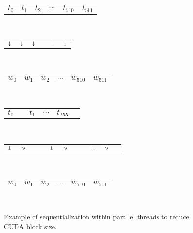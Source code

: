 \begin{figure}
  \centering
  \begin{minipage}{0.45\textwidth}
    \centering
      \begin{tabular}{C{0.6cm}C{0.6cm}C{0.6cm}C{0.6cm}C{0.6cm}C{0.6cm}}
        $t_0$ & $t_1$ & $t_2$ & $\cdots$ & $t_{510}$ & $t_{511}$\\
      \end{tabular}\\[-0.5ex]
      \begin{tabular}{C{0.6cm}C{0.6cm}C{0.6cm}C{0.6cm}C{0.6cm}C{0.6cm}}
        $\shortdownarrow$ & $\shortdownarrow$ & $\shortdownarrow$ & & $\shortdownarrow$ & $\shortdownarrow$\\
      \end{tabular}\\[-0.5ex]
      \begin{tabular}{|C{0.6cm}|C{0.6cm}|C{0.6cm}|C{0.6cm}|C{0.6cm}|C{0.6cm}|}
        \hline
        $w_0$ & $w_1$ & $w_2$ & $\cdots$ & $w_{510}$ & $w_{511}$\\
        \hline
      \end{tabular}\\
    \end{minipage}
    \begin{minipage}{0.45\textwidth}
      \centering
      \begin{tabular}{C{0.6cm}C{0.6cm}C{0.6cm}C{0.6cm}C{0.6cm}C{0.6cm}}
        $t_0$ &  & $t_1$ & $\cdots$ & $t_{255}$ & \\
      \end{tabular}\\[-0.5ex]
      \begin{tabular}{C{0.105cm}C{0.105cm}C{0.105cm}C{0.105cm}C{0.105cm}C{0.105cm}C{0.105cm}C{0.105cm}C{0.105cm}C{0.105cm}C{0.105cm}}
        $\shortdownarrow$ & $\diagonalarrowdown$ &  &  & $\shortdownarrow$ & $\diagonalarrowdown$ &  &  & $\shortdownarrow$ & $\diagonalarrowdown$ & \\
      \end{tabular}\\[-0.5ex]
      \begin{tabular}{|C{0.6cm}|C{0.6cm}|C{0.6cm}|C{0.6cm}|C{0.6cm}|C{0.6cm}|}
        \hline
        $w_0$ & $w_1$ & $w_2$ & $\cdots$ & $w_{510}$ & $w_{511}$\\
        \hline
      \end{tabular}\\
    \end{minipage}
    \caption{\footnotesize Example of sequentialization within parallel threads to reduce CUDA block size.}
    \label{fig:seqexa}
\end{figure}

